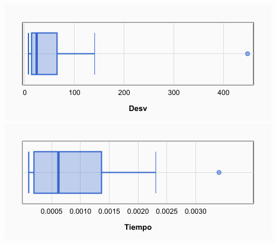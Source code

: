 \documentclass[a4paper, 12pt]{article}
\begin{document}
      \begin{center}
         \includegraphics[scale=0.42]{boxplot-greedy-desv}
         \includegraphics[scale=0.42]{boxplot-greedy-time}
      \end{center}
      
      
      \newpage
\end{document}
